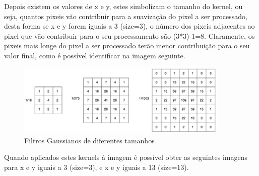 \documentclass[a4paper]{report}
\begin{document}
Depois existem os valores de x e y, estes simbolizam o tamanho do kernel, ou seja, quantos pixeis vão contribuir para a suavização do pixel a ser processado, desta forma se x e y forem iguais a 3 (size=3), o número dos pixeis adjacentes ao pixel que vão contribuir para o seu processamento são (3*3)-1=8. Claramente, os pixeis mais longe do pixel a ser processado terão menor contribuição para o seu valor final, como é possível identificar na imagem seguinte.


\begin{figure}[H]
    \centering
        \includegraphics[width=0.9\textwidth]{images/Canny/GaussianFilters.png}
        \caption{Filtros Gaussianos de diferentes tamanhos}
\end{figure}


Quando aplicados estes kernels à imagem é possível obter as seguintes imagens para x e y iguais a 3 (size=3), e x e y iguais a 13 (size=13). 
\end{document}
